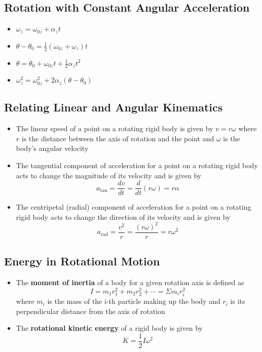 \documentclass{article}
\begin{document}
\subsection{Rotation with Constant Angular Acceleration}

\begin{itemize}
  \item $\omega_z=\omega_{0z}+\alpha_zt$

  \item $\theta-\theta_0=\frac{1}{2}\left(\omega_{0z}+\omega_z\right)t$

  \item $\theta=\theta_0+\omega_{0z}t+\frac{1}{2}\alpha_zt^2$

  \item $\omega_z^2=\omega_{0z}^2+2\alpha_z\left(\theta-\theta_0\right)$
\end{itemize}

\subsection{Relating Linear and Angular Kinematics}

\begin{itemize}
  \item The linear speed of a point on a rotating rigid body is given by $v=r\omega$ where $r$ is the distance between the axis of rotation and the point and $\omega$ is the body's angular velocity

  \item The tangential component of acceleration for a point on a rotating rigid body acts to change the magnitude of its velocity and is given by \[a_\textrm{tan}=\frac{dv}{dt}=\frac{d}{dt}(r\omega)=r\alpha\]

  \item The centripetal (radial) component of acceleration for a point on a rotating rigid body acts to change the direction of its velocity and is given by \[a_\textrm{rad}=\frac{v^2}{r}=\frac{(r\omega)^2}{r}=r\omega^2\]
\end{itemize}

\subsection{Energy in Rotational Motion}

\begin{itemize}
  \item The \textbf{moment of inertia} of a body for a given rotation axis is defined as \[I=m_1r_1^2+m_2r_2^2+\cdots=\Sigma m_ir_i^2\] where $m_i$ is the mass of the i-th particle making up the body and $r_i$ is its perpendicular distance from the axis of rotation

  \item The \textbf{rotational kinetic energy} of a rigid body is given by \[K=\frac{1}{2}I\omega^2\]
\end{itemize}
\end{document}
